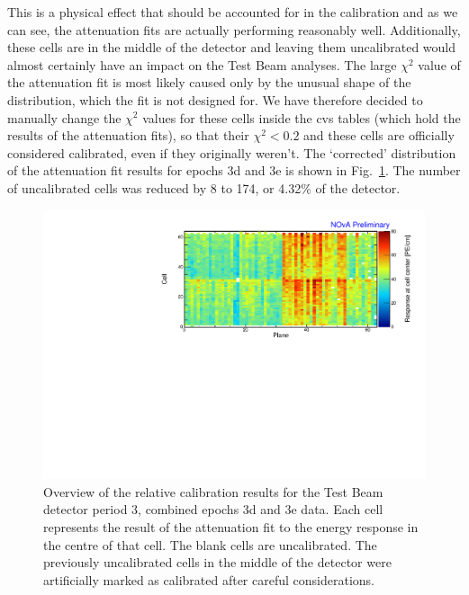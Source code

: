 This is a physical effect that should be accounted for in the calibration and as we can see, the attenuation fits are actually performing reasonably well. Additionally, these cells are in the middle of the detector and leaving them uncalibrated would almost certainly have an impact on the Test Beam analyses. The large $\chi^2$ value of the attenuation fit is most likely caused only by the unusual shape of the distribution, which the fit is not designed for. We have therefore decided to manually change the $\chi^2$ values for these cells inside the cvs tables (which hold the results of the attenuation fits), so that their $\chi^2<0.2$ and these cells are officially considered calibrated, even if they originally weren't. The `corrected' distribution of the attenuation fit results for epochs 3d and 3e is shown in Fig.~\ref{fig:CellCentreResponseEp3de_updated}. The number of uncalibrated cells was reduced by 8 to 174, or 4.32\% of the detector.

\begin{figure}[!hbtp]
\centering
\includegraphics[width=\textwidth]{Plots/TBCalibration/CellResponseAtCentre_epoch3de_Limited_NOvAPlotStyle.pdf}
\caption[Corrected map of fitted response at cell centre for epochs 3d and 3e data]{Overview of the relative calibration results for the Test Beam detector period 3, combined epochs 3d and 3e data. Each cell represents the result of the attenuation fit to the energy response in the centre of that cell. The blank cells are uncalibrated. The previously uncalibrated cells in the middle of the detector were artificially marked as calibrated after careful considerations.}
\label{fig:CellCentreResponseEp3de_updated}
\end{figure}

